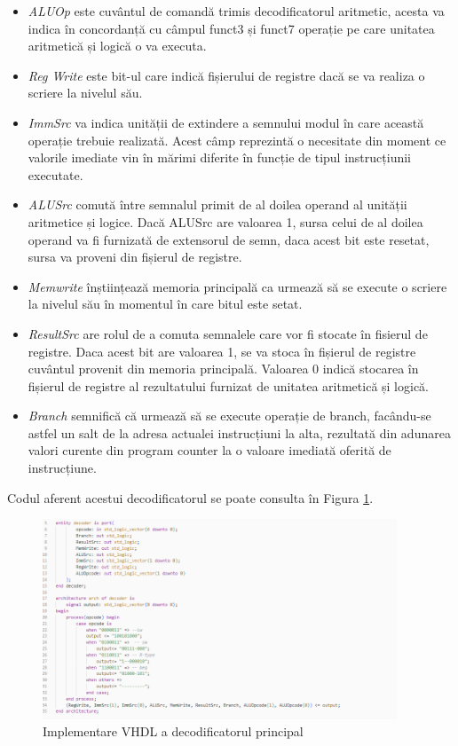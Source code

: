 \documentclass[12pt]{article}
\begin{document}
\begin{itemize}
\item \textit{ALUOp} este cuvântul de comandă trimis decodificatorul aritmetic, acesta va indica în concordanță cu câmpul funct3 și funct7 operație pe care unitatea aritmetică și logică o va executa.
\item \textit{Reg Write} este bit-ul care indică fișierului de registre dacă se va realiza o scriere la nivelul său.
\item \textit{ImmSrc} va indica unității de extindere a semnului modul în care această operație trebuie realizată. Acest câmp reprezintă o necesitate din moment ce valorile imediate vin în mărimi diferite în funcție de tipul instrucțiunii executate.
\item \textit{ALUSrc} comută între semnalul primit de al doilea operand al unității aritmetice și logice. Dacă ALUSrc are valoarea 1, sursa celui de al doilea operand va fi furnizată de extensorul de semn, daca acest bit este resetat, sursa va proveni din fișierul de registre. 
\item \textit{Memwrite} înștiințează memoria principală ca urmează să se execute o scriere la nivelul său în momentul în care bitul este setat.
\item \textit{ResultSrc} are rolul de a comuta semnalele care vor fi stocate în fisierul de registre. Daca acest bit are valoarea 1, se va stoca în fișierul de registre cuvântul provenit din memoria principală. Valoarea 0 indică stocarea în fișierul de registre al rezultatului furnizat de unitatea aritmetică și logică.

\item \textit{Branch} semnifică că urmează să se execute operație de branch, facându-se astfel un salt de la adresa actualei instrucțiuni la alta, rezultată din adunarea valori curente din program counter la o valoare imediată oferită de instrucțiune.
\end{itemize}

Codul aferent acestui decodificatorul se poate consulta în Figura \ref{Figura:47}.

\newpage

 \begin{figure}[h!]
 \includegraphics[width=0.94\textwidth]{decodercode.png}
 \centering
 \caption{Implementare VHDL a decodificatorul principal}
 \label{Figura:47}
 \end{figure}
 
\end{document}
